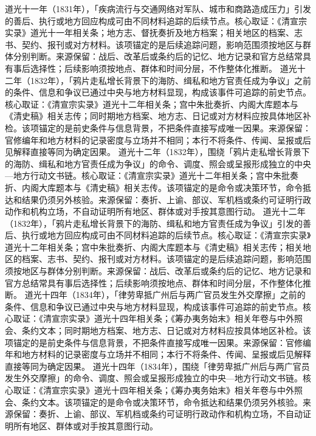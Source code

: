 道光十一年（1831年），「疾病流行与交通网络对军队、城市和商路造成压力」引发的善后、执行或地方回应构成可由不同材料追踪的后续节点。核心取证：《清宣宗实录》道光十一年相关条；地方志、督抚奏折及地方档案；相关地区的档案、志书、契约、报刊或对方材料。该项锚定的是后续追踪问题，影响范围须按地区与群体分别判断。来源保留：战后、改革后或条约后的记忆、地方记录和官方总结常具有事后选择性；后续影响须按地点、群体和时间分层，不作整体化推断。
道光十二年（1832年），「鸦片走私增长背景下的海防、缉私和地方官责任成为争议」之前的条件、信息和争议已通过中央与地方材料显现，构成该事件可追踪的前史节点。核心取证：《清宣宗实录》道光十二年相关条；宫中朱批奏折、内阁大库题本与《清史稿》相关志传；同时期地方档案、地方志、日记或对方材料应按具体地区补检。该项锚定的是前史条件与信息背景，不把条件直接写成唯一因果。来源保留：官修编年和地方材料的记录密度与立场并不相同；本行不将条件、传闻、呈报或后见解释直接等同为确定因果。
道光十二年（1832年），围绕「鸦片走私增长背景下的海防、缉私和地方官责任成为争议」的命令、调度、照会或呈报形成独立的中央—地方行动文书链。核心取证：《清宣宗实录》道光十二年相关条；宫中朱批奏折、内阁大库题本与《清史稿》相关志传。该项锚定的是命令或决策环节，命令抵达和结果仍须另外核验。来源保留：奏折、上谕、部议、军机档或条约可证明行政动作和机构立场，不自动证明所有地区、群体或对手按其意图行动。
道光十二年（1832年），「鸦片走私增长背景下的海防、缉私和地方官责任成为争议」引发的善后、执行或地方回应构成可由不同材料追踪的后续节点。核心取证：《清宣宗实录》道光十二年相关条；宫中朱批奏折、内阁大库题本与《清史稿》相关志传；相关地区的档案、志书、契约、报刊或对方材料。该项锚定的是后续追踪问题，影响范围须按地区与群体分别判断。来源保留：战后、改革后或条约后的记忆、地方记录和官方总结常具有事后选择性；后续影响须按地点、群体和时间分层，不作整体化推断。
道光十四年（1834年），「律劳卑抵广州后与两广官员发生外交摩擦」之前的条件、信息和争议已通过中央与地方材料显现，构成该事件可追踪的前史节点。核心取证：《清宣宗实录》道光十四年相关条；《筹办夷务始末》相关年卷与中外照会、条约文本；同时期地方档案、地方志、日记或对方材料应按具体地区补检。该项锚定的是前史条件与信息背景，不把条件直接写成唯一因果。来源保留：官修编年和地方材料的记录密度与立场并不相同；本行不将条件、传闻、呈报或后见解释直接等同为确定因果。
道光十四年（1834年），围绕「律劳卑抵广州后与两广官员发生外交摩擦」的命令、调度、照会或呈报形成独立的中央—地方行动文书链。核心取证：《清宣宗实录》道光十四年相关条；《筹办夷务始末》相关年卷与中外照会、条约文本。该项锚定的是命令或决策环节，命令抵达和结果仍须另外核验。来源保留：奏折、上谕、部议、军机档或条约可证明行政动作和机构立场，不自动证明所有地区、群体或对手按其意图行动。
